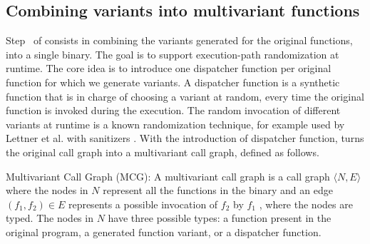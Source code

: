 \subsection*{Combining variants into multivariant functions}

Step~ of \tool consists in combining the variants generated for the original functions, into a single binary.
The goal is to support execution-path randomization at runtime.
The core idea is to introduce one dispatcher function per original function for which we generate variants.
A dispatcher function is a synthetic function that is in charge of choosing a variant at random, every time the original function is invoked during the execution.
The random invocation of different variants at runtime is a known randomization technique, for example used by Lettner et al. with sanitizers \cite{lettner2018partisan}.
With the introduction of dispatcher function,  \tool turns the original call graph into a multivariant call graph, defined as follows. 

\begin{definition}{Multivariant Call Graph (MCG):}\label{def:EP}
    A multivariant call graph is a call graph $\langle N,E \rangle$ where the nodes in $N$ represent all the functions in the binary and an edge $(f_1,f_2) \in E$ represents a possible invocation of $f_2$ by $f_1$  \cite{ryder1979}, where the nodes are typed. The nodes in $N$ have three possible types: a function present in the original program,  a generated function variant, or a dispatcher function.
\end{definition}


